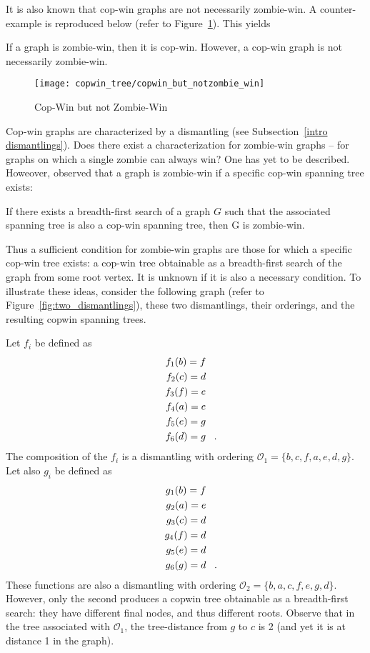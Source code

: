 It is also known \cite{fitzpatrick2016deterministic} that cop-win graphs are not necessarily zombie-win. A counter-example  is reproduced below (refer to Figure~\ref{fig:copwin_but_notzombie_win}). This yields

\begin{theorem}
If a graph is zombie-win, then it is cop-win. However, a cop-win graph is not necessarily zombie-win.
\end{theorem}

\begin{figure}
\centering
\texttt{[image: copwin\_tree/copwin\_but\_notzombie\_win]}
\caption{Cop-Win but not Zombie-Win \label{fig:copwin_but_notzombie_win}}
\end{figure}

Cop-win graphs are characterized by a dismantling (see Subsection~\ref{intro dismantlings}). Does there exist a characterization for zombie-win graphs -- for graphs on which a single zombie can always win? One has yet to be described. Howeover, \cite{fitzpatrick2016deterministic} observed that a graph is zombie-win if a specific cop-win spanning tree exists:

\begin{theorem} If there exists a breadth-first search of a graph $G$ such that the associated spanning tree is also a cop-win spanning tree, then G is zombie-win. \label{thm:zombie_tree}
\end{theorem}

Thus a sufficient condition for zombie-win graphs are those for which a specific cop-win tree exists: a cop-win tree obtainable as a breadth-first search of the graph from some root vertex. It is unknown if it is also a necessary condition. To illustrate these ideas, consider the following graph (refer to Figure~\ref{fig:two_dismantlings}), these two dismantlings, their orderings, and the resulting copwin spanning trees.

Let $f_i$ be defined as
\begin{align*}
  f_1(b) = f \\
  f_2(c) = d \\
  f_3(f) = e \\
  f_4(a) = e \\
  f_5(e) = g \\
  f_6(d) = g \mperiod
\end{align*}
The composition of the $f_i$ is a dismantling with ordering $\mathcal{O}_1 = \{ b, c, f, a, e, d, g \}$.
Let also $g_i$ be defined as
\begin{align*}
  g_1(b) = f \\
  g_2(a) = e \\
  g_3(c) = d \\
  g_4(f) = d \\
  g_5(e) = d \\
  g_6(g) = d \mperiod
\end{align*}
These functions are also a dismantling with ordering $\mathcal{O}_2 = \{b, a, c, f, e, g, d \}$.
However, only the second produces a copwin tree obtainable as a breadth-first search: they have different final nodes, and thus different roots. Observe that in the tree associated with $\mathcal{O}_1$, the tree-distance from $g$ to $c$ is 2 (and yet it is at distance 1 in the graph).

